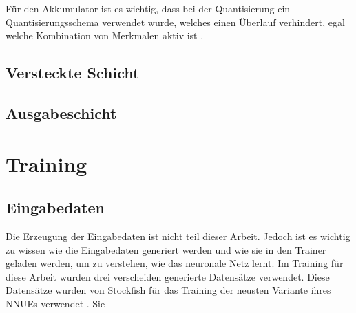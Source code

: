 Für den Akkumulator ist es wichtig, dass bei der Quantisierung ein Quantisierungsschema verwendet wurde, welches einen Überlauf verhindert, egal welche Kombination von Merkmalen aktiv ist \cite{StockfishNNUE}.

\subsection{Versteckte Schicht}

\subsection{Ausgabeschicht}


\section{Training}

\subsection{Eingabedaten}

Die Erzeugung der Eingabedaten ist nicht teil dieser Arbeit. Jedoch ist es wichtig zu wissen wie die Eingabedaten generiert werden und wie sie in den Trainer geladen werden, um zu verstehen, wie das neuronale Netz lernt. Im Training für diese Arbeit wurden drei verscheiden generierte Datensätze verwendet. Diese Datensätze wurden von Stockfish für das Training der neusten Variante ihres \acp{NNUE} verwendet \cite{StockfishNewestNetJul04}. Sie





